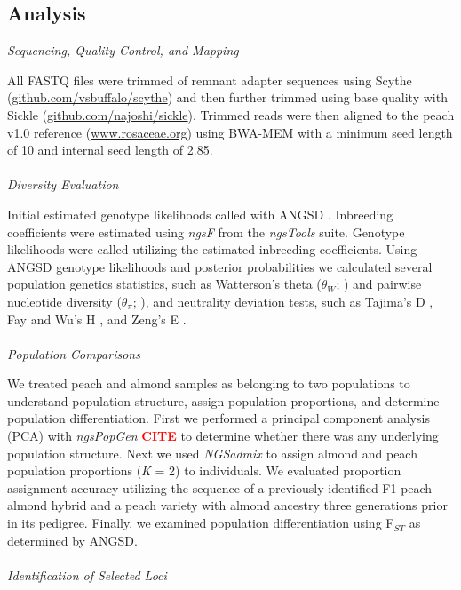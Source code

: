 \documentclass[12pt]{article}
\newcommand{\citex}{\textcolor{red}{\bf CITE }}
\newcommand{\jri}[1]{\textcolor{red}{\emph{#1}}}
\newcommand{\dv}[1]{\textcolor{blue}{\emph{#1}}}
\begin{document}
\subsection*{Analysis}
\emph{Sequencing, Quality Control, and Mapping}

%
All FASTQ files were trimmed of remnant adapter sequences using Scythe (\url{github.com/vsbuffalo/scythe}) and then further trimmed using base quality with Sickle (\url{github.com/najoshi/sickle}). 
%
Trimmed reads were then aligned to the peach v1.0 reference (\url{www.rosaceae.org}) using BWA-MEM \citep{li2013aligning} with a minimum seed length of 10 and internal seed length of 2.85.
\\
%
%
\\
\emph{Diversity Evaluation}

Initial estimated genotype likelihoods called with ANGSD \citep{korneliussen2014angsd}. 
%
Inbreeding coefficients were estimated using \emph{ngsF} from the \emph{ngsTools} \citep{fumagalli2014ngstools} suite.
%
Genotype likelihoods were called utilizing the estimated inbreeding coefficients. 
%
Using ANGSD genotype likelihoods and posterior probabilities we calculated several population genetics statistics, such as Watterson's theta ($\theta_{W}$; \citealp{watterson1975number}) and pairwise nucleotide diversity ($\theta_{\pi}$; \citealp{nei1979mathematical}), and neutrality deviation tests, such as Tajima's D \citep{tajima1989statistical}, Fay and Wu's H \citep{fay2000hitchhiking}, and Zeng's E \citep{zeng2006statistical}.
\\
%
\\
\emph{Population Comparisons}

We treated peach and almond samples as belonging to two populations to understand population structure, assign population proportions, and determine population differentiation. 
%
First we performed a principal component analysis (PCA) with \emph{ngsPopGen} \citex to determine whether there was any underlying population structure.
%
Next we used \emph{NGSadmix} \citep{skotte2013estimating} to assign almond and peach population proportions (\emph{K} = 2) to individuals. 
%
We evaluated proportion assignment accuracy utilizing the sequence of a previously identified F1 peach-almond hybrid and a peach variety with almond ancestry three generations prior in its pedigree. 
%
Finally, we examined population differentiation using F$_{ST}$ as determined by ANGSD.
\\
\\
\emph{Identification of Selected Loci}
\end{document}
